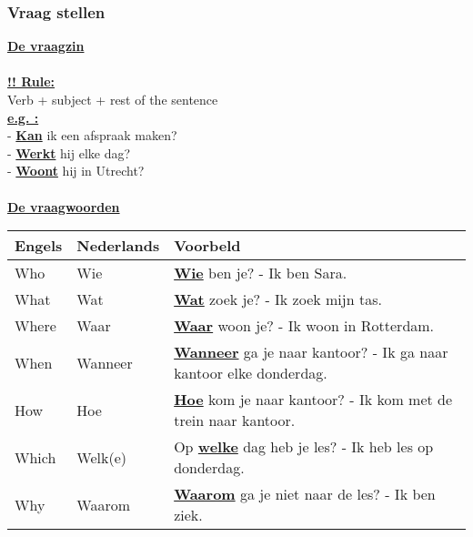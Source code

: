 \documentclass[a4paper,14pt]{extarticle}
\newcommand{\attention}[1]{\underline{\textbf{!! #1}}}
\newcommand{\emp}[1]{\underline{\textbf{#1}}}
\begin{document}
\subsubsection{Vraag stellen}
\emp{De vraagzin} \\ \\
\attention{Rule:} \\
Verb + subject + rest of the sentence \\
\emp{e.g. :} \\
- \emp{Kan} ik een afspraak maken? \\
- \emp{Werkt} hij elke dag? \\ 
- \emp{Woont} hij in Utrecht?\\ \\
\emp{De vraagwoorden} 
\begin{center}
\begin{tabularx}{\textwidth}{ l l p{350pt} }
 \hline
 Engels & Nederlands & Voorbeld \\
 \hline
 Who & Wie & \emp{Wie} ben je? - Ik ben Sara. \\
 What & Wat & \emp{Wat} zoek je? - Ik zoek mijn tas. \\
 Where & Waar & \emp{Waar} woon je? - Ik woon in Rotterdam. \\
 When & Wanneer & \emp{Wanneer} ga je naar kantoor? - Ik ga naar kantoor elke donderdag. \\
 How & Hoe & \emp{Hoe} kom je naar kantoor? - Ik kom met de trein naar kantoor. \\
 Which & Welk(e) & Op \emp{welke} dag heb je les? - Ik heb les op donderdag. \\
 Why & Waarom & \emp{Waarom} ga je niet naar de les? - Ik ben ziek.
\end{tabularx}
\end{center}
\newpage
\end{document}
